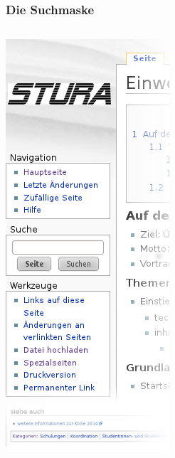\documentclass{beamer}
\begin{document}
\begin{frame}
  \frametitle{Die Suchmaske}

  \begin{columns}
    \begin{column}{0.3\linewidth}
      \begin{center}
        \includegraphics[width=\linewidth]{Stura-Wiki-Seitenleiste}
      \end{center}
    \end{column}


\end{columns}
\end{frame}
\end{document}
